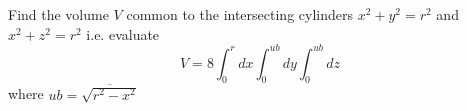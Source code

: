 \example{}

Find the volume $V$ common to the intersecting cylinders $x^2 + y^2
= r^2$ and $x^2 + z^2 = r^2$ i.e. evaluate
\begin{equation*}
V = 8 \int^r_0 dx \int^{ub}_0 dy \int^{ub}_0 dz
\end{equation*}
where $ub = \overline{\sqrt { r^2 - x^2}}$
